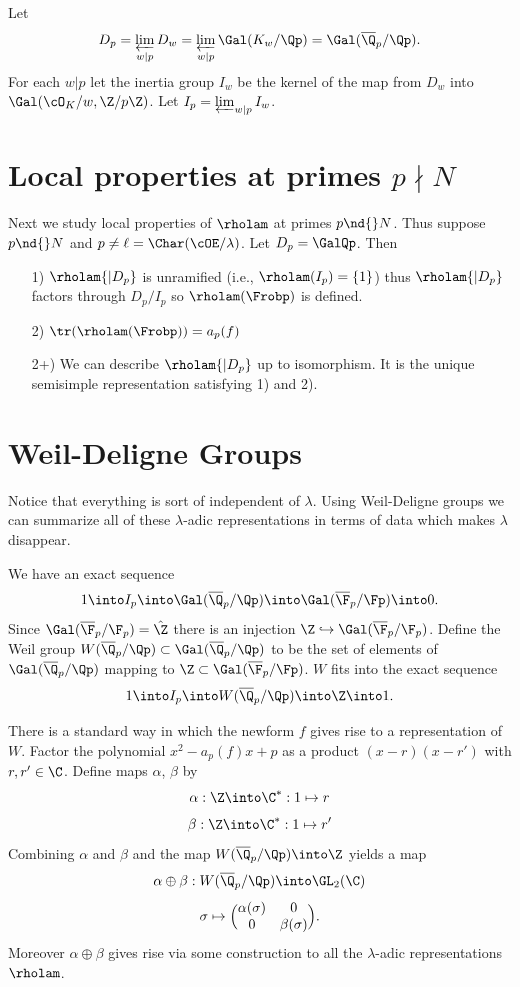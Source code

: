 \documentclass{report}
\begin{document}
Let
$$D_p=\varprojlim_{w|p}D_w=\varprojlim_{w|p}\Gal(K_w/\Qp)=\Gal(\overline{\Q}_p/\Qp).$$
For each $w|p$ let the inertia group $I_w$ be the kernel of
the map from $D_w$ into $\Gal(\cO_K/w,\Z/p\Z)$. Let $I_p=\varprojlim_{w|p} I_w$.

\section{Local properties at primes $p\nmid N$}\label{localpnmidN}
Next we study local properties of $\rholam$ at primes $p\nd{}N$.
Thus suppose $p\nd{}N$ and $p\neq\ell=\Char(\cOE/\lambda)$. Let
$D_p=\GalQp$. Then
\begin{itemize}
\item[1)] $\rholam{|D_p}$ is unramified (i.e., $\rholam(I_p)=\{1\}$) thus
$\rholam{|D_p}$ factors through $D_p/I_p$ so $\rholam(\Frobp)$ is
defined.
\item[2)] $\tr(\rholam(\Frobp))=a_p(f)$
\item[2+)] We can describe $\rholam{|D_p}$ up to isomorphism.
It is the unique semisimple representation satisfying 1) and 2).
\end{itemize}
\section{Weil-Deligne Groups}
Notice that everything is sort of independent of $\lambda$.
Using Weil-Deligne groups we can summarize all of these $\lambda$-adic
representations in terms of data which makes $\lambda$ disappear.

We have an exact sequence
$$1\into I_p\into\Gal(\overline{\Q}_p/\Qp)\into\Gal(\overline{\F}_p/\Fp)\into 0.$$
Since $\Gal(\overline{\F}_p/\F_p)=\hat{\Z}$ there is an injection
$\Z\hookrightarrow\Gal(\overline{\F}_p/\F_p)$.
Define the Weil group $W(\overline{\Q}_p/\Qp)\subset\Gal(\overline{\Q}_p/\Qp)$
to be the set of elements of $\Gal(\overline{\Q}_p/\Qp)$ mapping
to $\Z\subset\Gal(\overline{\F}_p/\Fp)$.
$W$ fits into the exact sequence
$$1\into I_p\into W(\overline{\Q}_p/\Qp)\into\Z\into 1.$$

There is a standard way in which the newform $f$ gives rise to
a representation of $W$. Factor the polynomial $x^2-a_p(f)x+p$ as
a product $(x-r)(x-r')$ with $r,r'\in\C$. Define maps
$\alpha$, $\beta$ by
$$\alpha:\Z\into\C^* : 1\mapsto r$$
$$\beta:\Z\into\C^* : 1\mapsto r'$$
Combining $\alpha$ and $\beta$ and the map $W(\overline{\Q}_p/\Qp)\into \Z$
yields a map
$$\alpha\oplus\beta:W(\overline{\Q}_p/\Qp)\into\GL_2(\C)$$
$$\sigma\mapsto\Bigl(\begin{matrix}\alpha(\sigma)&0\\0&\beta(\sigma)\end{matrix}\Bigr).$$
Moreover $\alpha\oplus\beta$ gives rise via some construction to all
the $\lambda$-adic representations $\rholam$.
\end{document}
